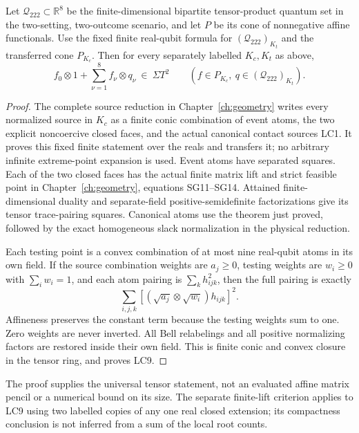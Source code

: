 \begin{corollary}
Let \(\mathcal Q_{222}\subset\mathbb R^8\) be the finite-dimensional
bipartite tensor-product quantum set in the two-setting,
two-outcome scenario, and let \(P\) be its cone of nonnegative
affine functionals.  Use the fixed finite real-qubit formula
for \((\mathcal Q_{222})_{K_t}\) and the transferred cone
\(P_{K_c}\).  Then for every separately labelled \(K_c,K_t\)
as above,
\[
 f_0\otimes1+\sum_{\nu=1}^8 f_\nu\otimes q_\nu
       \ \in\ \Sigma T^2
 \qquad
 (f\in P_{K_c},\ q\in(\mathcal Q_{222})_{K_t}).
\tag{LC9}
\]
\end{corollary}

\begin{proof}
The complete source reduction in Chapter~\ref{ch:geometry} writes every normalized
source in \(K_c\) as a finite conic combination of event atoms,
the two explicit noncoercive closed faces, and the actual
canonical contact sources LC1.  It proves this fixed finite
statement over the reals and transfers it; no arbitrary
infinite extreme-point expansion is used.
Event atoms have separated squares.  Each of the two closed
faces has the actual finite matrix lift and strict feasible
point in Chapter~\ref{ch:geometry}, equations SG11--SG14.
Attained finite-dimensional duality and separate-field
positive-semidefinite factorizations give its tensor
trace-pairing squares.  Canonical atoms use the theorem
just proved, followed by the exact homogeneous slack
normalization in the physical reduction.

Each testing point is a convex combination of at most nine
real-qubit atoms in its own field.  If the source combination
weights are \(a_j\geq0\), testing weights are \(w_i\geq0\)
with \(\sum_iw_i=1\), and each atom pairing is
\(\sum_k h_{ijk}^2\), then the full pairing is exactly
\[
       \sum_{i,j,k}
        \left[(\sqrt{a_j}\otimes\sqrt{w_i})h_{ijk}\right]^2 .
\tag{LC10}
\]
Affineness preserves the constant term because the testing
weights sum to one.  Zero weights are never inverted.
All Bell relabelings and all positive normalizing factors
are restored inside their own field.  This is finite conic
and convex closure in the tensor ring, and proves LC9.
\end{proof}

The proof supplies the universal tensor statement, not an
evaluated affine matrix pencil or a numerical bound on its
size.  The separate finite-lift criterion applies to LC9
using two labelled copies of any one real closed extension;
its compactness conclusion is not inferred from a sum of
the local root counts.

